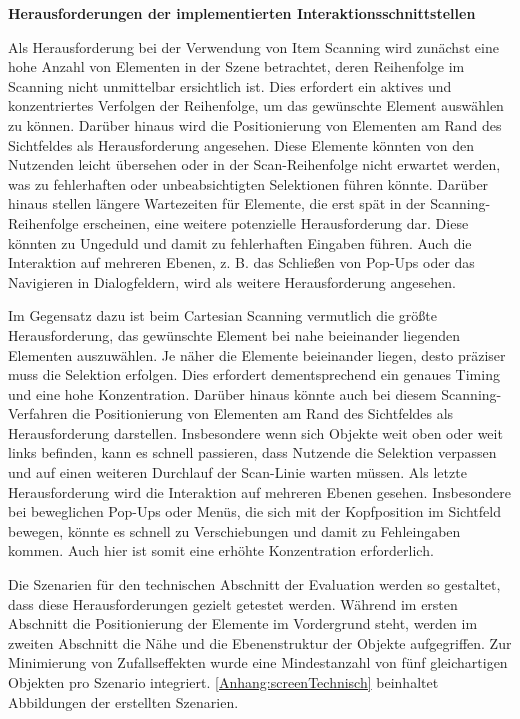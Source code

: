 \textbf{Herausforderungen der implementierten Interaktionsschnittstellen}

Als Herausforderung bei der Verwendung von Item Scanning wird zunächst eine hohe Anzahl von Elementen in der Szene betrachtet, deren Reihenfolge im Scanning nicht unmittelbar ersichtlich ist. Dies erfordert ein aktives und konzentriertes Verfolgen der Reihenfolge, um das gewünschte Element auswählen zu können. Darüber hinaus wird die Positionierung von Elementen am Rand des Sichtfeldes als Herausforderung angesehen. Diese Elemente könnten von den Nutzenden leicht übersehen oder in der Scan-Reihenfolge nicht erwartet werden, was zu fehlerhaften oder unbeabsichtigten Selektionen führen könnte. Darüber hinaus stellen längere Wartezeiten für Elemente, die erst spät in der Scanning-Reihenfolge erscheinen, eine weitere potenzielle Herausforderung dar. Diese könnten zu Ungeduld und damit zu fehlerhaften Eingaben führen. Auch die Interaktion auf mehreren Ebenen, z. B.  das Schließen von Pop-Ups oder das Navigieren in Dialogfeldern, wird als weitere Herausforderung angesehen.

Im Gegensatz dazu ist beim Cartesian Scanning vermutlich die größte Herausforderung, das gewünschte Element bei nahe beieinander liegenden Elementen auszuwählen. Je näher die Elemente beieinander liegen, desto präziser muss die Selektion erfolgen. Dies erfordert dementsprechend ein genaues Timing und eine hohe Konzentration. Darüber hinaus könnte auch bei diesem Scanning-Verfahren die Positionierung von Elementen am Rand des Sichtfeldes als Herausforderung darstellen. Insbesondere wenn sich Objekte weit oben oder weit links befinden, kann es schnell passieren, dass Nutzende die Selektion verpassen und auf einen weiteren Durchlauf der Scan-Linie warten müssen. Als letzte Herausforderung wird die Interaktion auf mehreren Ebenen gesehen. Insbesondere bei beweglichen Pop-Ups oder Menüs, die sich mit der Kopfposition im Sichtfeld bewegen, könnte es schnell zu Verschiebungen und damit zu Fehleingaben kommen. Auch hier ist somit eine erhöhte Konzentration erforderlich. 

Die Szenarien für den technischen Abschnitt der Evaluation werden so gestaltet, dass diese Herausforderungen gezielt getestet werden. Während im ersten Abschnitt die Positionierung der Elemente im Vordergrund steht, werden im zweiten Abschnitt die Nähe und die Ebenenstruktur der Objekte aufgegriffen. Zur Minimierung von Zufallseffekten wurde eine Mindestanzahl von fünf gleichartigen Objekten pro Szenario integriert. \autoref{Anhang:screenTechnisch} beinhaltet Abbildungen der erstellten Szenarien. 

